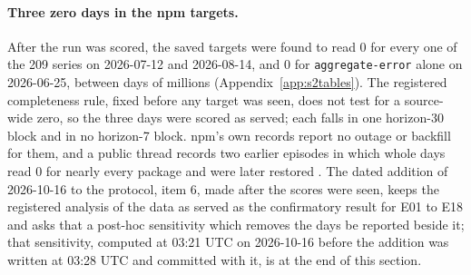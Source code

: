 \paragraph{Three zero days in the npm targets.} After the run was scored, the saved targets were found to
read 0 for every one of the 209 series on 2026-07-12 and 2026-08-14, and 0 for \texttt{aggregate-error}
alone on 2026-06-25, between days of millions (Appendix~\ref{app:s2tables}). The registered completeness
rule, fixed before any target was seen, does not test for a source-wide zero, so the three days were scored
as served; each falls in one horizon-30 block and in no horizon-7 block. npm's own records report no outage
or backfill for them, and a public thread records two earlier episodes in which whole days read 0 for nearly
every package and were later restored \citep{npm-community-150808}. The dated addition of 2026-10-16 to the
protocol, item 6, made after the scores were seen, keeps the registered analysis of the data as served as
the confirmatory result for E01 to E18 and asks that a post-hoc sensitivity which removes the days be
reported beside it; that sensitivity, computed at 03:21 UTC on 2026-10-16 before the addition was written
at 03:28 UTC and committed with it, is at the end of this section.

